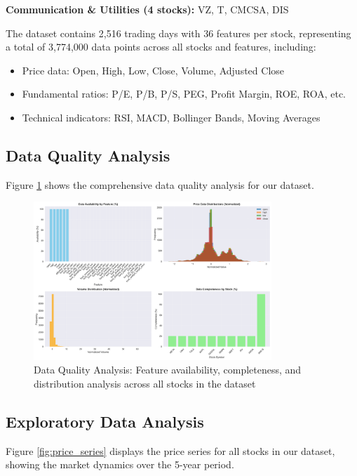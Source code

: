 \documentclass[11pt]{article}
\begin{document}
\textbf{Communication \& Utilities (4 stocks):} VZ, T, CMCSA, DIS

The dataset contains 2,516 trading days with 36 features per stock, representing a total of 3,774,000 data points across all stocks and features, including:
\begin{itemize}
    \item Price data: Open, High, Low, Close, Volume, Adjusted Close
    \item Fundamental ratios: P/E, P/B, P/S, PEG, Profit Margin, ROE, ROA, etc.
    \item Technical indicators: RSI, MACD, Bollinger Bands, Moving Averages
\end{itemize}

\subsection{Data Quality Analysis}

Figure \ref{fig:data_quality} shows the comprehensive data quality analysis for our dataset.

\begin{figure}[H]
\centering
\includegraphics[width=0.8\textwidth]{figures/eda_data_quality_analysis.png}
\caption{Data Quality Analysis: Feature availability, completeness, and distribution analysis across all stocks in the dataset}
\label{fig:data_quality}
\end{figure}

\subsection{Exploratory Data Analysis}

Figure \ref{fig:price_series} displays the price series for all stocks in our dataset, showing the market dynamics over the 5-year period.
\end{document}
